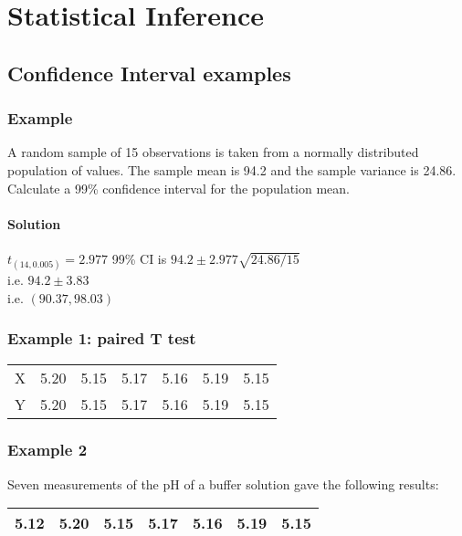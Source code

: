 \chapter{Statistical Inference}

\section{Confidence Interval examples}

\subsection{Example}
A random sample of 15 observations is taken from a normally distributed population
of values. The sample mean is 94.2 and the sample variance is 24.86.
Calculate a 99\% confidence interval for the population mean.


\subsubsection{Solution}
$t_(14,0.005) = 2.977$
99\% CI is $94.2 \pm 2.977 \sqrt{24.86/15}$ \\i.e. $94.2 \pm 3.83$ \\i.e. $(90.37,98.03)$


\subsection{Example 1: paired T test}


\begin{tabular}{|c|c|c|c|c|c|c|}
  \hline
X & 5.20 & 5.15 & 5.17 & 5.16 & 5.19 & 5.15\\
Y & 5.20 & 5.15 & 5.17 & 5.16 & 5.19 & 5.15\\
  \hline
\end{tabular}


\subsection{Example 2}

Seven measurements of the pH of a buffer solution gave the
following results:

\begin{tabular}{|c|c|c|c|c|c|c|}
  \hline
5.12 & 5.20 & 5.15 & 5.17 & 5.16 & 5.19 & 5.15\\
  \hline
\end{tabular}

